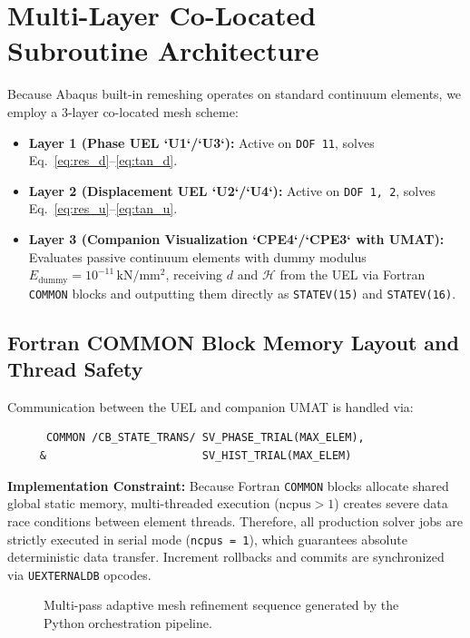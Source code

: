 \documentclass[11pt,a4paper]{report}
\begin{document}
\section{Multi-Layer Co-Located Subroutine Architecture}
Because Abaqus built-in remeshing operates on standard continuum elements, we employ a 3-layer co-located mesh scheme:
\begin{itemize}
    \item \textbf{Layer 1 (Phase UEL `U1`/`U3`):} Active on \texttt{DOF 11}, solves Eq.~\eqref{eq:res_d}--\eqref{eq:tan_d}.
    \item \textbf{Layer 2 (Displacement UEL `U2`/`U4`):} Active on \texttt{DOF 1, 2}, solves Eq.~\eqref{eq:res_u}--\eqref{eq:tan_u}.
    \item \textbf{Layer 3 (Companion Visualization `CPE4`/`CPE3` with UMAT):} Evaluates passive continuum elements with dummy modulus $E_{\text{dummy}} = 10^{-11}\,\mathrm{kN/mm^2}$, receiving $d$ and $\mathcal{H}$ from the UEL via Fortran \texttt{COMMON} blocks and outputting them directly as \texttt{STATEV(15)} and \texttt{STATEV(16)}.
\end{itemize}

\subsection{Fortran COMMON Block Memory Layout and Thread Safety}
Communication between the UEL and companion UMAT is handled via:
\begin{verbatim}
      COMMON /CB_STATE_TRANS/ SV_PHASE_TRIAL(MAX_ELEM),
     &                        SV_HIST_TRIAL(MAX_ELEM)
\end{verbatim}
\textbf{Implementation Constraint:} Because Fortran \texttt{COMMON} blocks allocate shared global static memory, multi-threaded execution ($\text{ncpus} > 1$) creates severe data race conditions between element threads. Therefore, all production solver jobs are strictly executed in serial mode (\texttt{ncpus = 1}), which guarantees absolute deterministic data transfer. Increment rollbacks and commits are synchronized via \texttt{UEXTERNALDB} opcodes.

\begin{figure}[htbp]
\centering
{}
\caption{Multi-pass adaptive mesh refinement sequence generated by the Python orchestration pipeline.}
\label{fig:mesh_evolution}
\end{figure}
\end{document}
